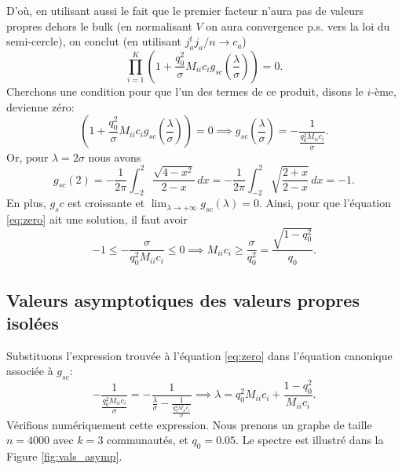 \documentclass[../../main.tex]{subfiles} %
\begin{document}
D'où, en utilisant aussi le fait que le premier facteur n'aura pas de valeurs 
propres dehors le bulk (en normalisant $V$ on aura convergence p.s. vers la loi
du semi-cercle), on conclut (en utilisant $j_a^t j_a / n \to c_a$)
\begin{equation*}
	\prod_{i=1}^K \left(1 + \frac{q_0^2}{\sigma} M_{ii} c_i g_{sc} 
	\left( \frac{\lambda}{\sigma} \right) \right) = 0.
\end{equation*}
Cherchons une condition pour que l'un des termes de ce produit, disons le 
$i$-ème, devienne zéro:
\begin{equation}
	\left(1 + \frac{q_0^2}{\sigma} M_{ii} c_i g_{sc} \left( \frac{\lambda}
	{\sigma} \right) \right) = 0 \implies g_{sc}
	\left( \frac{\lambda}{\sigma} \right) 
	= - \frac{1}{\frac{q_0^2 M_{ii} c_i}{\sigma}}.
	\label{eq:zero}
\end{equation}
Or, pour $\lambda = 2 \sigma$ nous avons
\begin{equation*}
	g_{sc}(2) = - \frac{1}{2 \pi} \int_{-2}^2 \frac{\sqrt{4 - x^2}}{2 - x} 
	\, dx = - \frac{1}{2 \pi} \int_{-2}^2 \sqrt{\frac{2+x}{2-x}} \, dx = -1.
\end{equation*}
En plus, $g_sc$ est croissante et $\lim_{\lambda \to +\infty} g_{sc}(\lambda) 
= 0$. Ainsi, pour que l'équation \ref{eq:zero} ait une solution, il faut avoir
\begin{equation*}
	-1 \leq - \frac{\sigma}{q_0^2 M_{ii} c_i} \leq 0 \implies M_{ii} c_i 
	\geq \frac{\sigma}{q_0^2} = \frac{\sqrt{1 - q_0^2}}{q_0}.
\end{equation*}

\subsection{Valeurs asymptotiques des valeurs propres isolées}
Substituons l'expression trouvée à l'équation \ref{eq:zero} dans l'équation 
canonique associée à $g_{sc}$:
\begin{equation}
	- \frac{1}{\frac{q_0^2 M_{ii} c_i}{\sigma}} 
	= - \frac{1}{\frac{\lambda}{\sigma} 
	- \frac{1}{\frac{q_0^2 M_{ii} c_i}{\sigma}}} \implies \lambda 
	= q_0^2 M_{ii} c_i + \frac{1 - q_0^2}{M_{ii} c_i}.
	\label{eq:valasymp}
\end{equation}
Vérifions numériquement cette expression. Nous prenons un graphe de taille 
$n = 4000$ avec $k=3$ communautés, et $q_0 = 0.05$. Le spectre est illustré 
dans la Figure \ref{fig:vals_asymp}.
\end{document}
